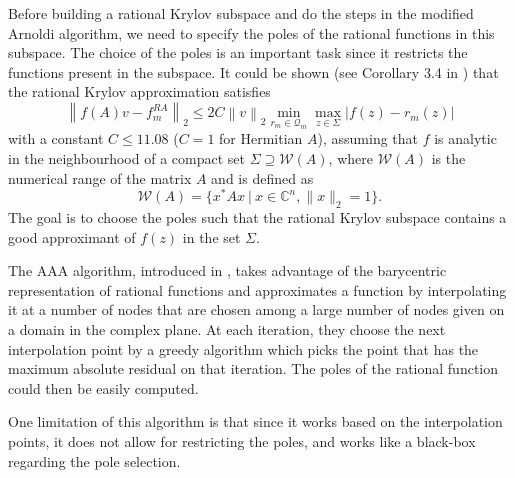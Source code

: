 Before building a rational Krylov subspace and do the steps in the modified Arnoldi
algorithm, we need to specify the poles of the rational functions in this subspace.
The choice of the poles is an important task since it restricts the functions present
in the subspace. It could be shown (see Corollary 3.4 in \cite{guttel2013rational}) that
the rational Krylov approximation satisfies
\begin{equation*}
    \left\| f(A)v - f_m^{RA}  \right\|_2 \le 2 C \left\| v \right\|_2
    \min_{r_m \in \mathcal{Q}_{m}} \max_{z \in \Sigma} | f(z) - r_m(z) |
\end{equation*}
with a constant $C \le 11.08$ ($C = 1$ for Hermitian $A$), assuming that $f$ is analytic in
the neighbourhood of a compact set $\Sigma \supseteq \mathcal{W}(A)$, where $\mathcal{W}(A)$
is the numerical range of the matrix $A$ and is defined as
\begin{equation}
    \label{eq:numericalrange}
    \mathcal{W}(A) = \{x^* A x \:|\: x \in \mathbb{C}^{n}, \|x\|_2=1\}.
\end{equation}
The goal is to choose the poles such that the rational Krylov subspace contains a good approximant
of $f(z)$ in the set $\Sigma$.

The AAA algorithm, introduced in \cite{nakatsukasa2018AAA}, takes advantage of the barycentric
representation of rational functions and approximates a function by interpolating it at a number
of nodes that are chosen among a large number of nodes given on a domain in the complex plane.
At each iteration, they choose the next interpolation point by a greedy algorithm which picks
the point that has the maximum absolute residual on that iteration. The poles of the rational
function could then be easily computed.

One limitation of this algorithm is that since it works based on the interpolation points,
it does not allow for restricting the poles, and works like a black-box regarding the pole selection.

